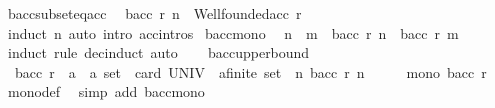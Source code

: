 \begin{isabellebody}
\isanewline
{}\isamarkupfalse%
\ bacc{\isacharunderscore}{\kern0pt}subseteq{\isacharunderscore}{\kern0pt}acc{\isacharcolon}{\kern0pt}\isanewline
\ \ {\isachardoublequoteopen}bacc\ r\ n\ {\isasymsubseteq}\ Wellfounded{\isachardot}{\kern0pt}acc\ r{\isachardoublequoteclose}\isanewline
%
\isadelimproof
\ \ %
\endisadelimproof
%
\isatagproof
{}\isamarkupfalse%
\ {\isacharparenleft}{\kern0pt}induct\ n{\isacharparenright}{\kern0pt}\ {\isacharparenleft}{\kern0pt}auto\ intro{\isacharcolon}{\kern0pt}\ acc{\isachardot}{\kern0pt}intros{\isacharparenright}{\kern0pt}%
\endisatagproof
{\isafoldproof}%
%
\isadelimproof
\isanewline
%
\endisadelimproof
\isanewline
{}\isamarkupfalse%
\ bacc{\isacharunderscore}{\kern0pt}mono{\isacharcolon}{\kern0pt}\isanewline
\ \ {\isachardoublequoteopen}n\ {\isasymle}\ m\ {\isasymLongrightarrow}\ bacc\ r\ n\ {\isasymsubseteq}\ bacc\ r\ m{\isachardoublequoteclose}\isanewline
%
\isadelimproof
\ \ %
\endisadelimproof
%
\isatagproof
{}\isamarkupfalse%
\ {\isacharparenleft}{\kern0pt}induct\ rule{\isacharcolon}{\kern0pt}\ dec{\isacharunderscore}{\kern0pt}induct{\isacharparenright}{\kern0pt}\ auto%
\endisatagproof
{\isafoldproof}%
%
\isadelimproof
\isanewline
%
\endisadelimproof
\ \ \isanewline
{}\isamarkupfalse%
\ bacc{\isacharunderscore}{\kern0pt}upper{\isacharunderscore}{\kern0pt}bound{\isacharcolon}{\kern0pt}\isanewline
\ \ {\isachardoublequoteopen}bacc\ {\isacharparenleft}{\kern0pt}r\ {\isacharcolon}{\kern0pt}{\isacharcolon}{\kern0pt}\ {\isacharparenleft}{\kern0pt}{\isacharprime}{\kern0pt}a\ {\isasymtimes}\ {\isacharprime}{\kern0pt}a{\isacharparenright}{\kern0pt}\ set{\isacharparenright}{\kern0pt}\ \ {\isacharparenleft}{\kern0pt}card\ {\isacharparenleft}{\kern0pt}UNIV\ {\isacharcolon}{\kern0pt}{\isacharcolon}{\kern0pt}\ {\isacharprime}{\kern0pt}a{\isacharcolon}{\kern0pt}{\isacharcolon}{\kern0pt}finite\ set{\isacharparenright}{\kern0pt}{\isacharparenright}{\kern0pt}\ {\isacharequal}{\kern0pt}\ {\isacharparenleft}{\kern0pt}{\isasymUnion}n{\isachardot}{\kern0pt}\ bacc\ r\ n{\isacharparenright}{\kern0pt}{\isachardoublequoteclose}\isanewline
%
\isadelimproof
%
\endisadelimproof
%
\isatagproof
{}\isamarkupfalse%
\ {\isacharminus}{\kern0pt}\isanewline
\ \ \isamarkupfalse%
\ {\isachardoublequoteopen}mono\ {\isacharparenleft}{\kern0pt}bacc\ r{\isacharparenright}{\kern0pt}{\isachardoublequoteclose}\ \isamarkupfalse%
\ mono{\isacharunderscore}{\kern0pt}def\ \isamarkupfalse%
\ {\isacharparenleft}{\kern0pt}simp\ add{\isacharcolon}{\kern0pt}\ bacc{\isacharunderscore}{\kern0pt}mono{\isacharparenright}{\kern0pt}\isanewline

\end{isabellebody}
